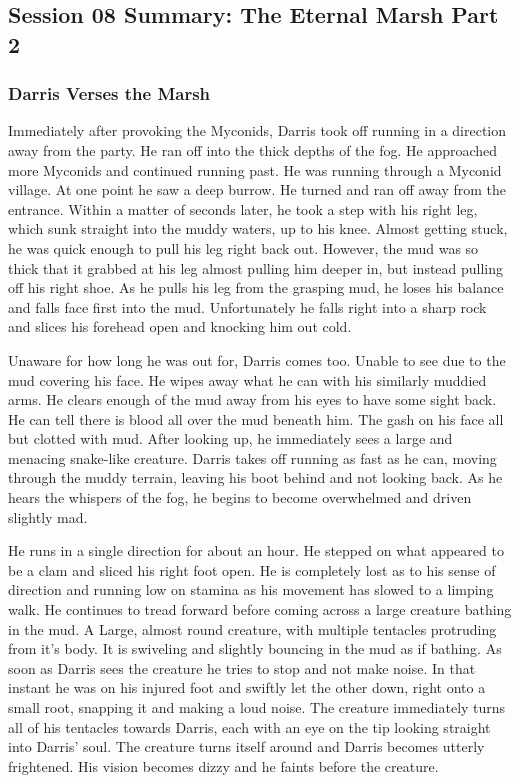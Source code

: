 \subsection{Session 08 Summary: The Eternal Marsh Part 2}

\subsubsection{Darris Verses the Marsh}

Immediately after provoking the Myconids, Darris took off running in a direction away from the party. He ran off into the thick depths of the fog. He approached more Myconids and continued running past. He was running through a Myconid village. At one point he saw a deep burrow. He turned and ran off away from the entrance. Within a matter of seconds later, he took a step with his right leg, which sunk straight into the muddy waters, up to his knee. Almost getting stuck, he was quick enough to pull his leg right back out. However, the mud was so thick that it grabbed at his leg almost pulling him deeper in, but instead pulling off his right shoe. As he pulls his leg from the grasping mud, he loses his balance and falls face first into the mud. Unfortunately he falls right into a sharp rock and slices his forehead open and knocking him out cold.

Unaware for how long he was out for, Darris comes too. Unable to see due to the mud covering his face. He wipes away what he can with his similarly muddied arms. He clears enough of the mud away from his eyes to have some sight back. He can tell there is blood all over the mud beneath him. The gash on his face all but clotted with mud. After looking up, he immediately sees a large and menacing snake-like creature. Darris takes off running as fast as he can, moving through the muddy terrain, leaving his boot behind and not looking back. As he hears the whispers of the fog, he begins to become overwhelmed and driven slightly mad.

He runs in a single direction for about an hour. He stepped on what appeared to be a clam and sliced his right foot open. He is completely lost as to his sense of direction and running low on stamina as his movement has slowed to a limping walk. He continues to tread forward before coming across a large creature bathing in the mud. A Large, almost round creature, with multiple tentacles protruding from it's body. It is swiveling and slightly bouncing in the mud as if bathing. As soon as Darris sees the creature he tries to stop and not make noise. In that instant he was on his injured foot and swiftly let the other down, right onto a small root, snapping it and making a loud noise. The creature immediately turns all of his tentacles towards Darris, each with an eye on the tip looking straight into Darris' soul. The creature turns itself around and Darris becomes utterly frightened. His vision becomes dizzy and he faints before the creature. 

